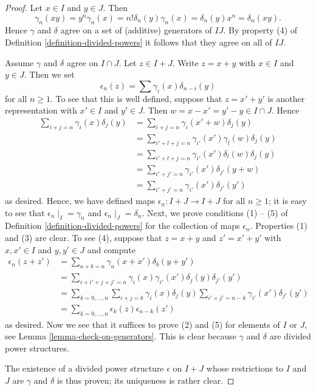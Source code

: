 \documentclass{stacks-project}
\theoremstyle{plain}
\theoremstyle{definition}
\theoremstyle{remark}
\numberwithin{equation}{subsection}
\begin{document}
\begin{proof}
Let $x \in I$ and $y \in J$. Then
$$
\gamma_n(xy) = y^n\gamma_n(x) = n! \delta_n(y) \gamma_n(x) =
\delta_n(y) x^n = \delta_n(xy).
$$
Hence $\gamma$ and $\delta$ agree on a set of (additive) generators
of $IJ$. By property (4) of Definition \ref{definition-divided-powers}
it follows that they agree on all of $IJ$.

\medskip\noindent
Assume $\gamma$ and $\delta$ agree on $I \cap J$.
Let $z \in I + J$. Write $z = x + y$ with $x \in I$ and $y \in J$.
Then we set
$$
\epsilon_n(z) = \sum \gamma_i(x)\delta_{n - i}(y)
$$
for all $n \geq 1$.
To see that this is well defined, suppose that $z = x' + y'$ is another
representation with $x' \in I$ and $y' \in J$. Then
$w = x - x' = y' - y \in I \cap J$. Hence
\begin{align*}
\sum\nolimits_{i + j = n} \gamma_i(x)\delta_j(y)
& =
\sum\nolimits_{i + j = n} \gamma_i(x' + w)\delta_j(y) \\
& =
\sum\nolimits_{i' + l + j = n} \gamma_{i'}(x')\gamma_l(w)\delta_j(y) \\
& =
\sum\nolimits_{i' + l + j = n} \gamma_{i'}(x')\delta_l(w)\delta_j(y) \\
& =
\sum\nolimits_{i' + j' = n} \gamma_{i'}(x')\delta_{j'}(y + w) \\
& =
\sum\nolimits_{i' + j' = n} \gamma_{i'}(x')\delta_{j'}(y')
\end{align*}
as desired. Hence, we have defined maps
$\epsilon_n : I + J \to I + J$ for all $n \geq 1$; it is easy
to see that $\epsilon_n \mid_{I} = \gamma_n$ and
$\epsilon_n \mid_{J} = \delta_n$.
Next, we prove conditions (1) -- (5) of
Definition \ref{definition-divided-powers} for the collection
of maps $\epsilon_n$.
Properties (1) and (3) are clear. To see (4), suppose
that $z = x + y$ and $z' = x' + y'$ with $x, x' \in I$ and $y, y' \in J$
and compute
\begin{align*}
\epsilon_n(z + z') & =
\sum\nolimits_{a + b = n} \gamma_a(x + x')\delta_b(y + y') \\
& =
\sum\nolimits_{i + i' + j + j' = n}
\gamma_i(x) \gamma_{i'}(x')\delta_j(y)\delta_{j'}(y') \\
& =
\sum\nolimits_{k = 0, \ldots, n}
\sum\nolimits_{i+j=k} \gamma_i(x)\delta_j(y)
\sum\nolimits_{i'+j'=n-k} \gamma_{i'}(x')\delta_{j'}(y') \\
& =
\sum\nolimits_{k = 0, \ldots, n}\epsilon_k(z)\epsilon_{n-k}(z')
\end{align*}
as desired. Now we see that it suffices to prove (2) and (5) for
elements of $I$ or $J$, see Lemma \ref{lemma-check-on-generators}.
This is clear because $\gamma$ and $\delta$ are divided power
structures.

\medskip\noindent
The existence of a divided power structure $\epsilon$ on $I+J$
whose restrictions to $I$ and $J$ are $\gamma$ and $\delta$ is
thus proven; its uniqueness is rather clear.
\end{proof}
\end{document}
